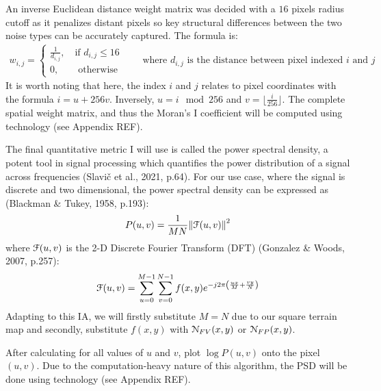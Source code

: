 An inverse Euclidean distance weight matrix was decided with a $16$ pixels radius cutoff as it penalizes distant pixels so key structural differences 
between the two noise types can be accurately captured. The formula is:
\begin{align*}
    w_{i,j}=
    \begin{cases}
        \frac{1}{d_{i,j}}, \quad\text{if } d_{i,j}\le16\\
        0, \qquad\text{otherwise}
    \end{cases}
    \qquad\text{where } d_{i,j} \text{ is the distance between pixel indexed } i \text{ and } j
\end{align*}
It is worth noting that here, the index $i$ and $j$ relates to pixel coordinates with the formula $i=u+256v$. Inversely, $u=i\mod 256$ and 
$v=\lfloor\frac{i}{256}\rfloor$. The complete spatial weight matrix, and thus the Moran's I coefficient will be computed using technology 
(see Appendix REF). 

The final quantitative metric I will use is called the power spectral density, a potent tool in signal processing which quantifies the power 
distribution of a signal across frequencies (Slavič et al., 2021, p.64). For our use case, where the signal is discrete and two dimensional, 
the power spectral density can be expressed as (Blackman \& Tukey, 1958, p.193):
\[P(u,v)=\frac{1}{MN}{\|\EuScript{F}(u,v)\|}^2\]
where $\EuScript{F}(u,v)$ is the 2-D Discrete Fourier Transform (DFT) (Gonzalez \& Woods, 2007, p.257):
\[\EuScript{F}(u,v)=\sum_{u=0}^{M-1}\sum_{v=0}^{N-1}f(x,y)e^{-j2\pi\left(\frac{ux}{M}+\frac{vy}{N}\right)}\]
Adapting to this IA, we will firstly substitute $M=N$ due to our square terrain map and secondly, substitute $f(x,y)$ with $\EuScript{N}_{FV}(x,y)$
or $\EuScript{N}_{FP}(x,y)$.

After calculating for all values of $u$ and $v$, plot $\log P(u,v)$ onto the pixel $(u,v)$. Due to the computation-heavy nature of this algorithm, 
the PSD will be done using technology (see Appendix REF).